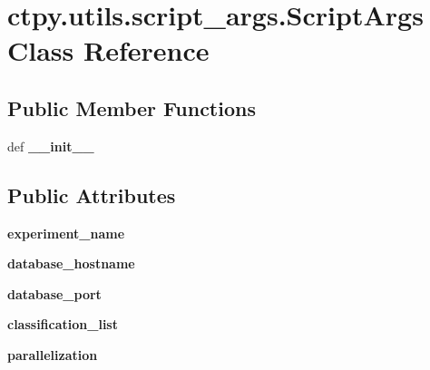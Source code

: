 \hypertarget{classctpy_1_1utils_1_1script__args_1_1_script_args}{\section{ctpy.\-utils.\-script\-\_\-args.\-Script\-Args Class Reference}
\label{classctpy_1_1utils_1_1script__args_1_1_script_args}
}
\subsection*{Public Member Functions}
\begin{DoxyCompactItemize}
\item 
\hypertarget{classctpy_1_1utils_1_1script__args_1_1_script_args_afa6de6722a57b8cffcbb772508024887}{def {\bfseries \-\_\-\-\_\-init\-\_\-\-\_\-}}\label{classctpy_1_1utils_1_1script__args_1_1_script_args_afa6de6722a57b8cffcbb772508024887}

\end{DoxyCompactItemize}
\subsection*{Public Attributes}
\begin{DoxyCompactItemize}
\item 
\hypertarget{classctpy_1_1utils_1_1script__args_1_1_script_args_a8190230c34ea72ccbdb53736f54ad21d}{{\bfseries experiment\-\_\-name}}\label{classctpy_1_1utils_1_1script__args_1_1_script_args_a8190230c34ea72ccbdb53736f54ad21d}

\item 
\hypertarget{classctpy_1_1utils_1_1script__args_1_1_script_args_a1a54fcb34e30a94ac8f23751ee71ce4f}{{\bfseries database\-\_\-hostname}}\label{classctpy_1_1utils_1_1script__args_1_1_script_args_a1a54fcb34e30a94ac8f23751ee71ce4f}

\item 
\hypertarget{classctpy_1_1utils_1_1script__args_1_1_script_args_a55db3e14c5abf387d141092e4571f266}{{\bfseries database\-\_\-port}}\label{classctpy_1_1utils_1_1script__args_1_1_script_args_a55db3e14c5abf387d141092e4571f266}

\item 
\hypertarget{classctpy_1_1utils_1_1script__args_1_1_script_args_afbe19af07ce4af333ab71969472e75d4}{{\bfseries classification\-\_\-list}}\label{classctpy_1_1utils_1_1script__args_1_1_script_args_afbe19af07ce4af333ab71969472e75d4}

\item 
\hypertarget{classctpy_1_1utils_1_1script__args_1_1_script_args_a5abc22ae880888339a07eff349d69ea0}{{\bfseries parallelization}}\label{classctpy_1_1utils_1_1script__args_1_1_script_args_a5abc22ae880888339a07eff349d69ea0}

\end{DoxyCompactItemize}
